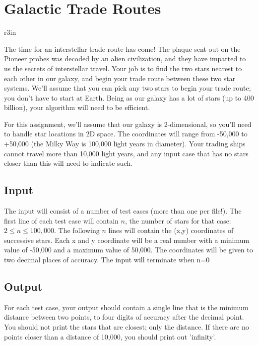\documentclass[11pt]{article}
\begin{document}
\section*{Galactic Trade Routes}


\begin{wrapfigure}{r}{3in}
\vspace{-10pt}
\vspace{-30pt}
\end{wrapfigure}

The time for an interstellar trade route has come! The plaque sent out on the Pioneer probes was decoded by an alien civilization, and they have imparted to us the secrets of interstellar travel. Your job is to find the two stars nearest to each other in our galaxy, and begin your trade route between these two star systems. We’ll assume that you can pick any two stars to begin your trade route; you don’t have to start at Earth. Being as our galaxy has a lot of stars (up to 400 billion), your algorithm will need to be efficient.

For this assignment, we'll assume that our galaxy is 2-dimensional, so you'll need to handle star locations in 2D space. The coordinates will range from -50,000 to +50,000 (the Milky Way is 100,000 light years in diameter). Your trading ships cannot travel more than 10,000 light years, and any input case that has no stars closer than this will need to indicate such.


\subsection*{Input}
The input will consist of a number of test cases (more than one per file!). The first line of each test case will contain $n$, the number of stars for that case: $2 \leq n \leq 100,000$. The following $n$ lines will contain the (x,y) coordinates of successive stars. Each x and y coordinate will be a real number with a minimum value of -50,000 and a maximum value of 50,000. The coordinates will be given to two decimal places of accuracy. The input will terminate when n=0

\subsection*{Output}
For each test case, your output should contain a single line that is the minimum distance between two points, to four digits of accuracy after the decimal point. You should not print the stars that are closest; only the distance. If there are no points closer than a distance of 10,000, you should print out ’infinity’.
\end{document}
